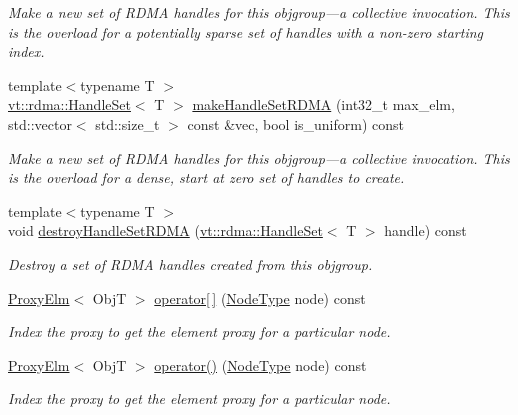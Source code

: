 \begin{DoxyCompactItemize}
\begin{DoxyCompactList}\small\item\em Make a new set of R\+D\+MA handles for this objgroup---a collective invocation. This is the overload for a potentially sparse set of handles with a non-\/zero starting index. \end{DoxyCompactList}\item 
{\footnotesize template$<$typename T $>$ }\\\hyperlink{structvt_1_1rdma_1_1_handle_set}{vt\+::rdma\+::\+Handle\+Set}$<$ T $>$ \hyperlink{structvt_1_1objgroup_1_1proxy_1_1_proxy_a297686853a318255a860cf7b2d63675c}{make\+Handle\+Set\+R\+D\+MA} (int32\+\_\+t max\+\_\+elm, std\+::vector$<$ std\+::size\+\_\+t $>$ const \&vec, bool is\+\_\+uniform) const
\begin{DoxyCompactList}\small\item\em Make a new set of R\+D\+MA handles for this objgroup---a collective invocation. This is the overload for a dense, start at zero set of handles to create. \end{DoxyCompactList}\item 
{\footnotesize template$<$typename T $>$ }\\void \hyperlink{structvt_1_1objgroup_1_1proxy_1_1_proxy_a9211f7a2459cfcb28f8b90dbdc77c8bc}{destroy\+Handle\+Set\+R\+D\+MA} (\hyperlink{structvt_1_1rdma_1_1_handle_set}{vt\+::rdma\+::\+Handle\+Set}$<$ T $>$ handle) const
\begin{DoxyCompactList}\small\item\em Destroy a set of R\+D\+MA handles created from this objgroup. \end{DoxyCompactList}\item 
\hyperlink{structvt_1_1objgroup_1_1proxy_1_1_proxy_elm}{Proxy\+Elm}$<$ ObjT $>$ \hyperlink{structvt_1_1objgroup_1_1proxy_1_1_proxy_a00a267a8730fe2547776ff0136ea3895}{operator\mbox{[}$\,$\mbox{]}} (\hyperlink{namespacevt_a866da9d0efc19c0a1ce79e9e492f47e2}{Node\+Type} node) const
\begin{DoxyCompactList}\small\item\em Index the proxy to get the element proxy for a particular node. \end{DoxyCompactList}\item 
\hyperlink{structvt_1_1objgroup_1_1proxy_1_1_proxy_elm}{Proxy\+Elm}$<$ ObjT $>$ \hyperlink{structvt_1_1objgroup_1_1proxy_1_1_proxy_ac290e4d37f05dc1183c205a1b9ee44cd}{operator()} (\hyperlink{namespacevt_a866da9d0efc19c0a1ce79e9e492f47e2}{Node\+Type} node) const
\begin{DoxyCompactList}\small\item\em Index the proxy to get the element proxy for a particular node. \end{DoxyCompactList}\end{DoxyCompactItemize}
